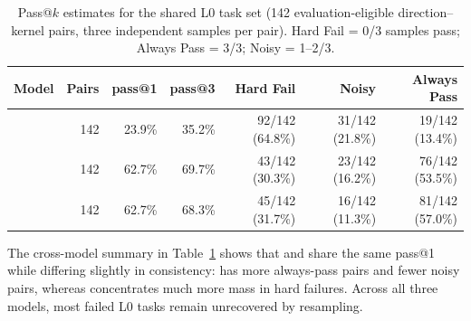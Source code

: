 \begin{table}[t]
\centering
\caption{Pass@$k$ estimates for the shared L0 task set (142 evaluation-eligible
direction--kernel pairs, three independent samples per pair). Hard Fail = 0/3
samples pass; Always Pass = 3/3; Noisy = 1--2/3.}
\label{tab:pass-at-k}
\small
\begin{tabular}{@{}lrrrrrr@{}}
\toprule
Model & Pairs & pass@1 & pass@3 & Hard Fail & Noisy & Always Pass \\
\midrule
\qwenshort{} & 142 & 23.9\% & 35.2\% & 92/142 (64.8\%) & 31/142 (21.8\%) & 19/142 (13.4\%) \\
\gptnew{} & 142 & 62.7\% & 69.7\% & 43/142 (30.3\%) & 23/142 (16.2\%) & 76/142 (53.5\%) \\
\codex{} & 142 & 62.7\% & 68.3\% & 45/142 (31.7\%) & 16/142 (11.3\%) & 81/142 (57.0\%) \\
\bottomrule
\end{tabular}
\end{table}

The cross-model summary in Table~\ref{tab:pass-at-k} shows that \gptnew{} and
\codex{} share the same pass@1 while differing slightly in consistency:
\codex{} has more always-pass pairs and fewer noisy pairs, whereas
\qwenshort{} concentrates much more mass in hard failures. Across all three
models, most failed L0 tasks remain unrecovered by resampling.


